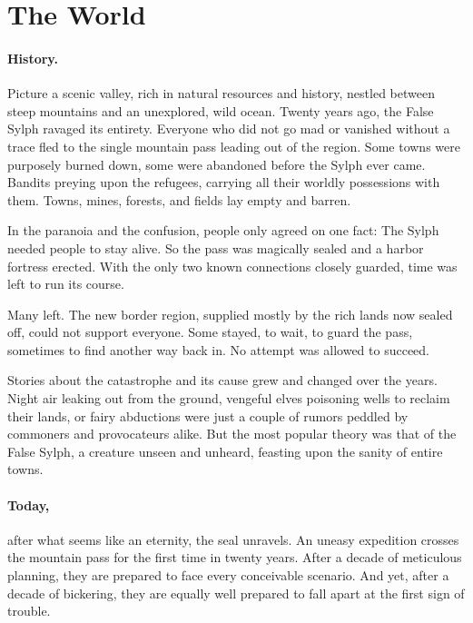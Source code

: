 \section{The World}\label{_introduction}

\paragraph{History.}
Picture a scenic valley, rich in natural resources and history,
nestled between steep mountains and an unexplored, wild ocean.
Twenty years ago, the False Sylph ravaged its entirety. Everyone who
did not go mad or vanished without a trace fled to the single mountain
pass leading out of the region.
Some towns were purposely burned down, some
were abandoned before the Sylph ever came. Bandits preying upon the
refugees, carrying all their worldly possessions with them. Towns,
mines, forests, and fields lay empty and barren.

In the paranoia and the confusion, people only agreed on one fact: The
Sylph needed people to stay alive. So the pass was magically sealed and
a harbor fortress erected. With the only two known connections
closely guarded, time was left to run its course.

Many left. The new border region, supplied mostly by the rich lands now sealed off, could not support everyone. Some stayed, to wait, to guard the pass, sometimes to find another way back in. No attempt was allowed to succeed.

Stories about the catastrophe and its cause grew and changed over the
years. Night air leaking out from the ground, vengeful elves poisoning
wells to reclaim their lands, or fairy abductions were just a couple
of rumors peddled by commoners and provocateurs alike. But the most
popular theory was that of the False Sylph, a creature unseen
and unheard, feasting upon the sanity of entire towns.

\paragraph{Today,} after what seems like an eternity, the seal unravels.
An uneasy expedition crosses the mountain pass for the first time in twenty years.
After a decade of meticulous planning, they are prepared to face every
conceivable scenario. And yet, after a decade of bickering, they are
equally well prepared to fall apart at the first sign of trouble.

\fleurontri


